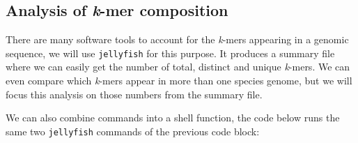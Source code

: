 \documentclass[10pt,a4paper,]{article}
\newenvironment{Shaded}{}{}
\newcommand{\CommentTok}[1]{\textcolor[rgb]{0.38,0.63,0.69}{\textit{#1}}}
\newcommand{\ExtensionTok}[1]{#1}
\newcommand{\FunctionTok}[1]{\textcolor[rgb]{0.02,0.16,0.49}{#1}}
\newcommand{\KeywordTok}[1]{\textcolor[rgb]{0.00,0.44,0.13}{\textbf{#1}}}
\newcommand{\NormalTok}[1]{#1}
\newcommand{\VariableTok}[1]{\textcolor[rgb]{0.10,0.09,0.49}{#1}}
\begin{document}
\hypertarget{analysis-of-k-mer-composition}{%
\subsection{\texorpdfstring{Analysis of \emph{k}-mer
composition}{Analysis of k-mer composition}}\label{analysis-of-k-mer-composition}}

There are many software tools to account for the \emph{k}-mers appearing
in a genomic sequence, we will use \texttt{jellyfish} for this purpose.
It produces a summary file where we can easily get the number of total,
distinct and unique \emph{k}-mers. We can even compare which
\emph{k}-mers appear in more than one species genome, but we will focus
this analysis on those numbers from the summary file.

\begin{Shaded}
\end{Shaded}

We can also combine commands into a shell function, the code below runs
the same two \texttt{jellyfish} commands of the previous code block:
\end{document}
